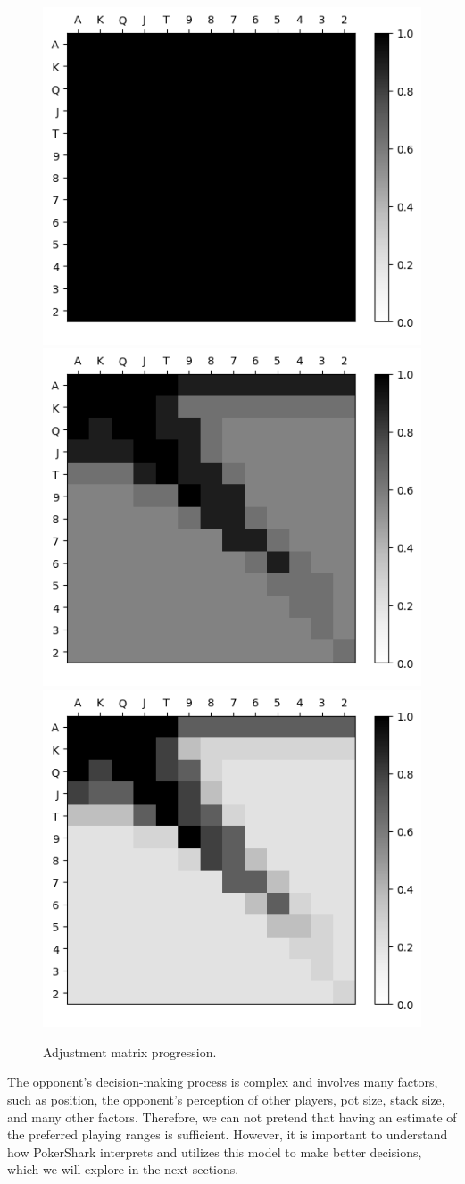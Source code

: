 

\begin{figure}[htp]

    \centering
    \includegraphics[width=.3\textwidth]{graphics/round_1.png}\hfill
    \includegraphics[width=.3\textwidth]{graphics/round_5.png}\hfill
    \includegraphics[width=.3\textwidth]{graphics/round_15.png}
    
    \caption{Adjustment matrix progression.}
    \label{fig:matrixProgression}
    
\end{figure}

The opponent's decision-making process is complex and involves many factors, such as position, the opponent's perception of other players, pot size, stack size, and many other factors. Therefore, we can not pretend that having an estimate of the preferred playing ranges is sufficient. However, it is important to understand how PokerShark interprets and utilizes this model to make better decisions, which we will explore in the next sections.

